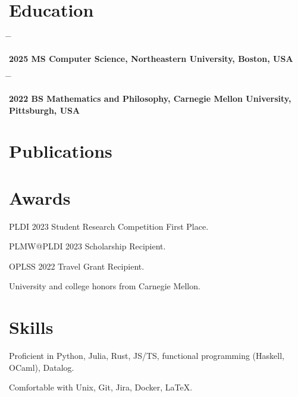 \documentclass[11pt]{article} %
\newcommand{\tabbedblock}[1]{
\begin{tabbing}
\hspace{2.5cm} \= \hspace{4cm} \= \kill
#1
\end{tabbing}
}
\begin{document}

\section{Education}

\tabbedblock{
\bf{2025} \>
\textbf{MS Computer Science}, Northeastern University, Boston, USA
}


\tabbedblock{
\bf{2022} \>
\textbf{BS Mathematics and Philosophy}, Carnegie Mellon University, Pittsburgh, USA
}

\section{Publications}

\printbibliography[heading=none]


\section{Awards}

PLDI 2023 Student Research Competition First Place.

PLMW@PLDI 2023 Scholarship Recipient.

OPLSS 2022 Travel Grant Recipient.

University and college honors from Carnegie Mellon.


\section{Skills}

Proficient in
Python,
Julia,
Rust, JS/TS,
functional programming (Haskell, OCaml), Datalog.

Comfortable with Unix, Git, Jira, Docker, LaTeX.
\end{document}
